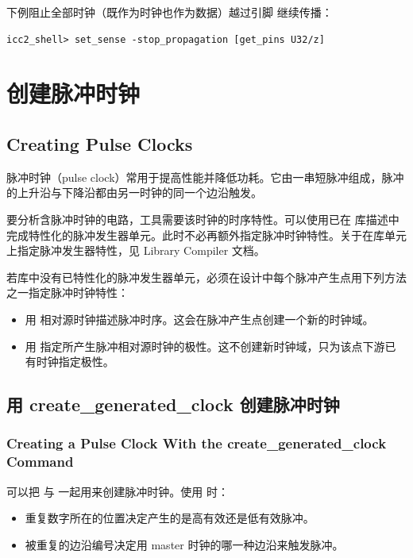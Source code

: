 下例阻止全部时钟（既作为时钟也作为数据）越过引脚  继续传播：
\begin{lstlisting}
icc2_shell> set_sense -stop_propagation [get_pins U32/z]
\end{lstlisting}

\section{创建脉冲时钟}
\subsection*{Creating Pulse Clocks}

脉冲时钟（pulse clock）常用于提高性能并降低功耗。它由一串短脉冲组成，脉冲的上升沿与下降沿都由另一时钟的同一个边沿触发。

要分析含脉冲时钟的电路，工具需要该时钟的时序特性。可以使用已在  库描述中完成特性化的脉冲发生器单元。此时不必再额外指定脉冲时钟特性。关于在库单元上指定脉冲发生器特性，见 Library Compiler 文档。

若库中没有已特性化的脉冲发生器单元，必须在设计中每个脉冲产生点用下列方法之一指定脉冲时钟特性：
\begin{itemize}
  \item 用  相对源时钟描述脉冲时序。这会在脉冲产生点创建一个新的时钟域。
  \item 用  指定所产生脉冲相对源时钟的极性。这不创建新时钟域，只为该点下游已有时钟指定极性。
\end{itemize}

\subsection{用 create\_generated\_clock 创建脉冲时钟}
\subsubsection*{Creating a Pulse Clock With the create\_generated\_clock Command}

可以把  与  一起用来创建脉冲时钟。使用  时：
\begin{itemize}
  \item 重复数字所在的位置决定产生的是高有效还是低有效脉冲。
  \item 被重复的边沿编号决定用 master 时钟的哪一种边沿来触发脉冲。
\end{itemize}


